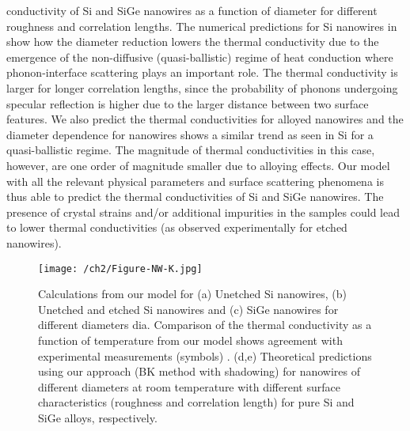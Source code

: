 conductivity of Si and SiGe nanowires as a function of diameter for different roughness and correlation lengths. The numerical predictions for Si nanowires in  show how the diameter reduction lowers the thermal conductivity due to the emergence of the non-diffusive (quasi-ballistic) regime of heat conduction where phonon-interface scattering plays an important role. The thermal conductivity is larger for longer correlation lengths, since the probability of phonons undergoing specular reflection is higher due to the larger distance between two surface features. We also predict the thermal conductivities for alloyed nanowires and the diameter dependence for  nanowires shows a similar trend as seen in Si for a quasi-ballistic regime. The magnitude of thermal conductivities in this case, however, are one order of magnitude smaller due to alloying effects. Our model with all the relevant physical parameters and surface scattering phenomena is thus able to predict the thermal conductivities of Si and SiGe nanowires. The presence of crystal strains and/or additional impurities in the samples could lead to lower thermal conductivities (as observed experimentally for etched nanowires).
\begin{sidewaysfigure}[hbtp]
	\texttt{[image: /ch2/Figure-NW-K.jpg]}
	\caption{Calculations from our model for (a) Unetched Si nanowires, (b) Unetched and etched Si nanowires and (c) SiGe nanowires for different diameters \gls{dia}. Comparison of the thermal conductivity as a function of temperature from our model shows agreement with experimental measurements (symbols) \cite{RN20,RN131,RN111,RN130,RN116}. (d,e) Theoretical predictions using our approach (BK method with shadowing) for nanowires of different diameters at room temperature with different surface characteristics (roughness and correlation length) for pure Si and SiGe alloys, respectively.}
	\label{fig:ch2-nw-K}
\end{sidewaysfigure}

